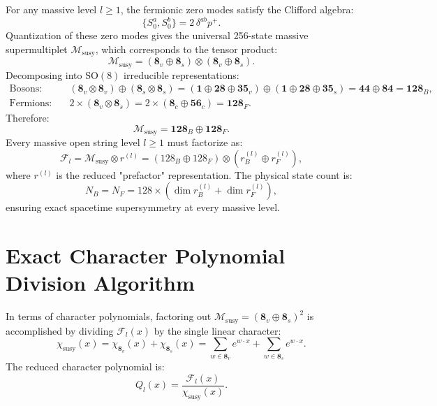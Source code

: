 \documentclass[11pt,a4paper]{article}
\begin{document}
For any massive level $l \ge 1$, the fermionic zero modes satisfy the Clifford algebra:
\begin{equation}
    \{S_0^a, S_0^b\} = 2 \, \delta^{ab} p^+.
\end{equation}
Quantization of these zero modes gives the universal 256-state massive supermultiplet $\mathcal{M}_{\text{susy}}$, which corresponds to the tensor product:
\begin{equation}
    \mathcal{M}_{\text{susy}} = (\mathbf{8}_v \oplus \mathbf{8}_s) \otimes (\mathbf{8}_v \oplus \mathbf{8}_s).
\end{equation}
Decomposing into $\mathrm{SO}(8)$ irreducible representations:
\begin{align}
    \text{Bosons:}\quad & (\mathbf{8}_v \otimes \mathbf{8}_v) \oplus (\mathbf{8}_s \otimes \mathbf{8}_s) = (\mathbf{1} \oplus \mathbf{28} \oplus \mathbf{35}_v) \oplus (\mathbf{1} \oplus \mathbf{28} \oplus \mathbf{35}_s) = \mathbf{44} \oplus \mathbf{84} = \mathbf{128}_B, \\
    \text{Fermions:}\quad & 2 \times (\mathbf{8}_v \otimes \mathbf{8}_s) = 2 \times (\mathbf{8}_c \oplus \mathbf{56}_c) = \mathbf{128}_F.
\end{align}
Therefore:
\begin{equation}
    \mathcal{M}_{\text{susy}} = \mathbf{128}_B \oplus \mathbf{128}_F.
\end{equation}
Every massive open string level $l \ge 1$ must factorize as:
\begin{equation}
    \mathcal{F}_l = \mathcal{M}_{\text{susy}} \otimes r^{(l)} = (128_B \oplus 128_F) \otimes (r_B^{(l)} \oplus r_F^{(l)}),
\end{equation}
where $r^{(l)}$ is the reduced "prefactor" representation. The physical state count is:
\begin{equation}
    N_B = N_F = 128 \times \left(\dim r_B^{(l)} + \dim r_F^{(l)}\right),
\end{equation}
ensuring exact spacetime supersymmetry at every massive level.

\section{Exact Character Polynomial Division Algorithm}

In terms of character polynomials, factoring out $\mathcal{M}_{\text{susy}} = (\mathbf{8}_v \oplus \mathbf{8}_s)^2$ is accomplished by dividing $\mathcal{F}_l(x)$ by the single linear character:
\begin{equation}
    \chi_{\text{susy}}(x) = \chi_{\mathbf{8}_v}(x) + \chi_{\mathbf{8}_s}(x) = \sum_{w \in \mathbf{8}_v} e^{w \cdot x} + \sum_{w \in \mathbf{8}_s} e^{w \cdot x}.
\end{equation}
The reduced character polynomial is:
\begin{equation}
    Q_l(x) = \frac{\mathcal{F}_l(x)}{\chi_{\text{susy}}(x)}.
\end{equation}
\end{document}
